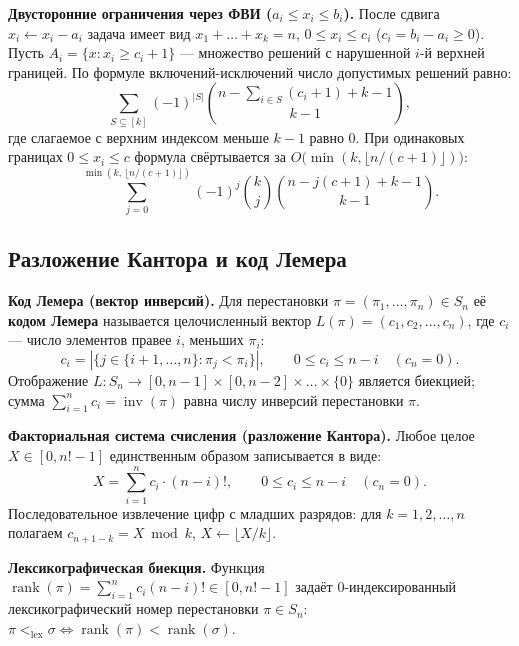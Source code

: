 \documentclass[10pt,a4paper]{article}
\renewcommand{\le}{\leqslant}
\renewcommand{\ge}{\geqslant}
\DeclareMathOperator{\rk}{rank}
\DeclareMathOperator{\inv}{inv}
\begin{document}
\textbf{Двусторонние ограничения через ФВИ ($a_i \le x_i \le b_i$).} После сдвига $x_i \leftarrow x_i - a_i$ задача имеет вид $x_1 + \dots + x_k = n$, $0 \le x_i \le c_i$ ($c_i = b_i - a_i \ge 0$). Пусть $A_i = \{x : x_i \ge c_i + 1\}$ — множество решений с нарушенной $i$-й верхней границей. По формуле включений-исключений число допустимых решений равно:
\[
  \sum_{S \subseteq [k]} (-1)^{|S|} \binom{n - \sum_{i \in S}(c_i + 1) + k - 1}{k - 1},
\]
где слагаемое с верхним индексом меньше $k - 1$ равно $0$. При одинаковых границах $0 \le x_i \le c$ формула свёртывается за $O\bigl(\min(k, \lfloor n/(c+1)\rfloor)\bigr)$:
\[
  \sum_{j=0}^{\min(k,\, \lfloor n / (c + 1) \rfloor)} (-1)^j \binom{k}{j} \binom{n - j(c + 1) + k - 1}{k - 1}.
\]

\subsection{Разложение Кантора и код Лемера}

\textbf{Код Лемера (вектор инверсий).} Для перестановки $\pi = (\pi_1, \dots, \pi_n) \in S_n$ её \textbf{кодом Лемера} называется целочисленный вектор $L(\pi) = (c_1, c_2, \dots, c_n)$, где $c_i$ — число элементов правее $i$, меньших $\pi_i$:
\[
  c_i = |\{j \in \{i + 1, \dots, n\} : \pi_j < \pi_i\}|, \qquad 0 \le c_i \le n - i \quad (c_n = 0).
\]
Отображение $L : S_n \to [0, n-1] \times [0, n-2] \times \dots \times \{0\}$ является биекцией; сумма $\sum_{i=1}^n c_i = \inv(\pi)$ равна числу инверсий перестановки $\pi$.

\textbf{Факториальная система счисления (разложение Кантора).} Любое целое $X \in [0, n! - 1]$ единственным образом записывается в виде:
\[
  X = \sum_{i=1}^{n} c_i \cdot (n - i)!, \qquad 0 \le c_i \le n - i \quad (c_n = 0).
\]
Последовательное извлечение цифр с младших разрядов: для $k = 1, 2, \dots, n$ полагаем $c_{n + 1 - k} = X \bmod k$, $X \leftarrow \lfloor X / k \rfloor$.

\textbf{Лексикографическая биекция.} Функция $\rk(\pi) = \sum_{i=1}^n c_i (n - i)! \in [0, n! - 1]$ задаёт $0$-индексированный лексикографический номер перестановки $\pi \in S_n$: $\pi <_{\mathrm{lex}} \sigma \iff \rk(\pi) < \rk(\sigma)$.
\end{document}

